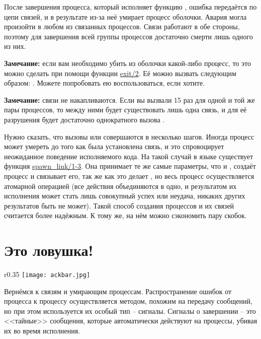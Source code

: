 После завершения процесса, который исполняет функцию , ошибка передаётся по цепи связей, и в результате из\--за неё умирает процесс оболочки.
Авария могла произойти в любом из связанных процессов.
Связи работают в обе стороны, поэтому для завершения всей группы процессов достаточно смерти лишь одного из них.\\
\colorbox{lgray}
{
\begin{minipage}{1.0\linewidth}
    \textbf{Замечание:} если вам необходимо убить из оболочки какой\--либо процесс, то это можно сделать при помощи функции \href{http://erldocs.com/R15B/erts/erlang.html\#exit/2}{exit/2}.
    Её можно вызвать следующим образом: .
    Можете попробовать ею воспользоваться, если хотите.
\end{minipage}
}
\colorbox{lgray}
{
\begin{minipage}{1.0\linewidth}
    \textbf{Замечание:} связи не накапливаются.
    Если вы вызвали  15 раз для одной и той же пары процессов, то между ними будет существовать лишь одна связь, и для её разрушения будет достаточно однократного вызова .
\end{minipage}
}

Нужно сказать, что вызовы  или  совершаются в несколько шагов.
Иногда процесс может умереть до того как была установлена связь, и это спровоцирует неожиданное поведение исполняемого кода.
На такой случай в языке существует функция \href{http://erldocs.com/R15B/erts/erlang.html\#spawn_link/1}{spawn\_link/1-3}.
Она принимает те же самые параметры, что и , создаёт процесс и связывает его, так же как это делает , но весь процесс осуществляется атомарной операцией (все действия объединяются в одно, и результатом их исполнения может стать лишь совокупный успех или неудача, никаких других результатов быть не может).
Такой способ создания процессов и их связей считается более надёжным.
К тому же, на нём можно сэкономить пару скобок.
\section{Это ловушка!}
\label{its-a-trap}
\begin{wrapfigure}{r}{0.35\linewidth}
    \texttt{[image: ackbar.jpg]}
\end{wrapfigure}
Вернёмся к связям и умирающим процессам.
Распространение ошибок от процесса к процессу осуществляется методом, похожим на передачу сообщений, но при этом используется их особый тип \--- сигналы.
Сигналы о завершении \--- это <<тайные>> сообщения, которые автоматически действуют на процессы, убивая их во время исполнения.

